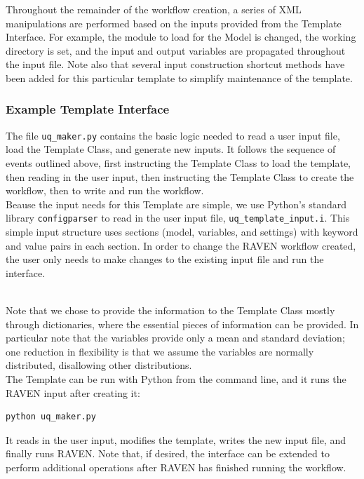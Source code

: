 Throughout the remainder of the workflow creation, a series of XML manipulations are performed based on the inputs provided from the Template Interface. For example, the module to load for the Model is changed, the working directory is set, and the input and output variables are propagated throughout the input file. Note also that several input construction shortcut methods have been added for this particular template to simplify maintenance of the template.


\subsubsection{Example Template Interface}
The file \texttt{uq\_maker.py} contains the basic logic needed to read a user input file, load the Template Class, and generate new inputs. It follows the sequence of events outlined above, first instructing the Template Class to load the template, then reading in the user input, then instructing the Template Class to create the workflow, then to write and run the workflow.
\\

Beause the input needs for this Template are simple, we use Python's standard library \texttt{configparser} to read in the user input file, \texttt{uq_template_input.i}. This simple input structure uses sections (model, variables, and settings) with keyword and value pairs in each section. In order to change the RAVEN workflow created, the user only needs to make changes to the existing input file and run the interface.

\\

Note that we chose to provide the information to the Template Class mostly through dictionaries, where the essential pieces of information can be provided. In particular note that the variables provide only a mean and standard deviation; one reduction in flexibility is that we assume the variables are normally distributed, disallowing other distributions.
\\

The Template can be run with Python from the command line, and it runs the RAVEN input after creating it:
\begin{lstlisting}[language=bash]
 python uq_maker.py
\end{lstlisting}
It reads in the user input, modifies the template, writes the new input file, and finally runs RAVEN. Note that, if desired, the interface can be extended to perform additional operations after RAVEN has finished running the workflow.
